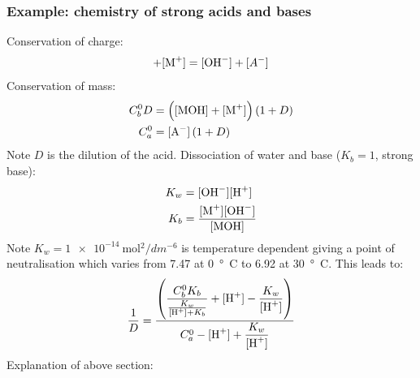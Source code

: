 \subsubsection{Example: chemistry of strong acids and bases}
Conservation of charge:
\begin{equation}
    [\ce{H^+}] + [\ce{M^+}] = [\ce{OH^-}] + [A^-]
\end{equation}
Conservation of mass:
\begin{align}
    C_b^0D & = \left([\ce{MOH}] + [\ce{M^+}]\right)\left(1 +D \right) \\
    C^0_a  & = [\ce{A^-}]\left(1+D\right)
\end{align}
Note $D$ is the dilution of the acid. Dissociation of water and base ($K_b = 1$, strong base):
\begin{align}
    K_w & = [\ce{OH^-}][\ce{H^+}]                     \\
    K_b & = \dfrac{[\ce{M^+}][\ce{OH^-}]}{[\ce{MOH}]}
\end{align}
Note $K_w = \SI{1e-14}{\mol^2 / dm^{-6}}$ is temperature dependent giving a point of neutralisation which varies from 7.47 at \SI{0}{\degree C} to 6.92 at \SI{30}{\degree C}. This leads to:
\begin{equation}
    \frac{1}{D} = \dfrac{\left(\dfrac{C^0_b K_b}{\frac{K_w}{[\ce{H^+}]+K_b}} + [\ce{H^+}]-\dfrac{K_w}{[\ce{H^+}]}\right)}{C^0_a - [\ce{H^+}]+\dfrac{K_w}{[\ce{H^+}]}}
\end{equation}
Explanation of above section:
